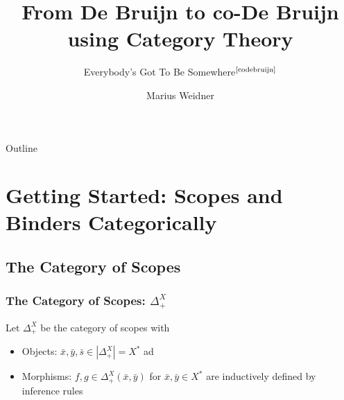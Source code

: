 \documentclass[aspectratio=169]{beamer}
\title{From De Bruijn to co-De Bruijn using Category Theory}
\subtitle{Everybody's Got To Be Somewhere$^{\text{\cite{codebruijn}}}$}
\institute[Uni Freiburg]{Chair of Programming Languages, University of
  Freiburg}
\author{Marius Weidner}
\theoremstyle{remarkstyle}
\begin{document}
\begin{frame}
  \titlepage{}
\end{frame}

\begin{frame}{Outline}
  \tableofcontents
\end{frame}

\section{Getting Started: Scopes and Binders Categorically}
\subsection{The Category of Scopes}

\begin{frame}[fragile]
  \frametitle{The Category of Scopes: $Δ_+^X$}
  \begin{definition}
    Let $Δ_+^X$ be the category of scopes with
    \begin{itemize}
      \item Objects: $\bar{x}, \bar{y}, \bar{s} ∈ |Δ_+^X| = X^*$ ad
      \item Morphisms: $f, g ∈ Δ_+^X(\bar{x}, \bar{y})$ for $\bar{x}, \bar{y} ∈ X^*$ are inductively defined by inference rules
    \end{itemize}
    \begin{columns}
      \begin{column}{0.04\textwidth}
      \end{column}
      \begin{column}{0.2\textwidth}
        \begin{center}
        \end{center}
      \end{column}
      \begin{column}{0.2\textwidth}
        \begin{center}
        \end{center}
      \end{column}
      \begin{column}{0.2\textwidth}
        \begin{center}
        \end{center}
      \end{column}

\end{columns}
\end{definition}
\end{frame}
\end{document}
